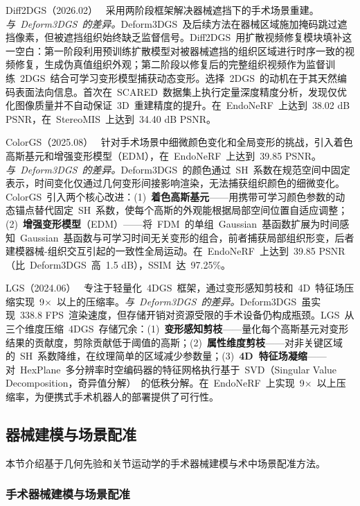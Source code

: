 Diff2DGS（2026.02）~\cite{2602_18314} 采用两阶段框架解决器械遮挡下的手术场景重建。\textit{与~Deform3DGS~的差异。}Deform3DGS~及后续方法在器械区域施加掩码跳过遮挡像素，但被遮挡组织始终缺乏监督信号。Diff2DGS~用扩散视频修复模块填补这一空白：第一阶段利用预训练扩散模型对被器械遮挡的组织区域进行时序一致的视频修复，生成伪真值组织外观；第二阶段以修复后的完整组织视频作为监督训练~2DGS~结合可学习变形模型捕获动态变形。选择~2DGS~的动机在于其天然编码表面法向信息。首次在~SCARED~数据集上执行定量深度精度分析，发现仅优化图像质量并不自动保证~3D~重建精度的提升。在~EndoNeRF~上达到~38.02 dB PSNR，在~StereoMIS~上达到~34.40 dB PSNR。

ColorGS（2025.08）~\cite{2508_18696} 针对手术场景中细微颜色变化和全局变形的挑战，引入着色高斯基元和增强变形模型（EDM），在~EndoNeRF~上达到~39.85 PSNR。\textit{与~Deform3DGS~的差异。}Deform3DGS~的颜色通过~SH~系数在规范空间中固定表示，时间变化仅通过几何变形间接影响渲染，无法捕获组织颜色的细微变化。ColorGS~引入两个核心改进：(1)~\textbf{着色高斯基元}——用携带可学习颜色参数的动态锚点替代固定~SH~系数，使每个高斯的外观能根据局部空间位置自适应调整；(2)~\textbf{增强变形模型}（EDM）——将~FDM~的单组~Gaussian~基函数扩展为时间感知~Gaussian~基函数与可学习时间无关变形的组合，前者捕获局部组织形变，后者建模器械-组织交互引起的一致性全局运动。在~EndoNeRF~上达到~39.85 PSNR（比~Deform3DGS~高~1.5 dB），SSIM~达~97.25\%。

LGS（2024.06）~\cite{2406_16073} 专注于轻量化~4DGS~框架，通过变形感知剪枝和~4D~特征场压缩实现~9$\times$~以上的压缩率。\textit{与~Deform3DGS~的差异。}Deform3DGS~虽实现~338.8 FPS~渲染速度，但存储开销对资源受限的手术设备仍构成瓶颈。LGS~从三个维度压缩~4DGS~存储冗余：(1)~\textbf{变形感知剪枝}——量化每个高斯基元对变形结果的贡献度，剪除贡献低于阈值的高斯；(2)~\textbf{属性维度剪枝}——对非关键区域的~SH~系数降维，在纹理简单的区域减少参数量；(3)~\textbf{4D~特征场凝缩}——对~HexPlane~多分辨率时空编码器的特征网格执行基于~SVD（Singular Value Decomposition，奇异值分解）~的低秩分解。在~EndoNeRF~上实现~9$\times$~以上压缩率，为便携式手术机器人的部署提供了可行性。

\subsection{器械建模与场景配准}
\label{ss:19_3}

本节介绍基于几何先验和关节运动学的手术器械建模与术中场景配准方法。

\subsubsection{手术器械建模与场景配准}

